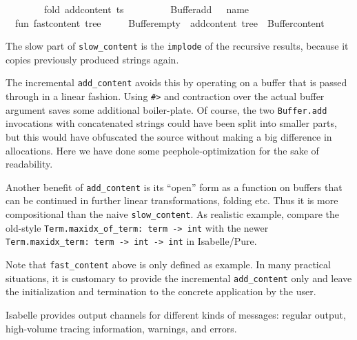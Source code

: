 \begin{isabellebody}
\ \ \ \ \ \ \ \ fold\ add{\isacharunderscore}content\ ts\ {\isacharhash}{\isachargreater}\isanewline
\ \ \ \ \ \ \ \ Buffer{\isachardot}add\ {\isacharparenleft}{\isachardoublequote}{\isacharless}{\isacharslash}{\isachardoublequote}\ {\isacharcircum}\ name\ {\isacharcircum}\ {\isachardoublequote}{\isachargreater}{\isachardoublequote}{\isacharparenright}{\isacharsemicolon}\isanewline
\isanewline
\ \ fun\ fast{\isacharunderscore}content\ tree\ {\isacharequal}\isanewline
\ \ \ \ Buffer{\isachardot}empty\ {\isacharbar}{\isachargreater}\ add{\isacharunderscore}content\ tree\ {\isacharbar}{\isachargreater}\ Buffer{\isachardot}content{\isacharsemicolon}\isanewline
{\isacharverbatimclose}%
\endisatagML
{\isafoldML}%
%
\isadelimML
%
\endisadelimML
%
\begin{isamarkuptext}%
The slow part of \verb|slow_content| is the \verb|implode| of
  the recursive results, because it copies previously produced strings
  again.

  The incremental \verb|add_content| avoids this by operating on a
  buffer that is passed through in a linear fashion.  Using \verb|#>| and contraction over the actual buffer argument saves some
  additional boiler-plate.  Of course, the two \verb|Buffer.add|
  invocations with concatenated strings could have been split into
  smaller parts, but this would have obfuscated the source without
  making a big difference in allocations.  Here we have done some
  peephole-optimization for the sake of readability.

  Another benefit of \verb|add_content| is its ``open'' form as a
  function on buffers that can be continued in further linear
  transformations, folding etc.  Thus it is more compositional than
  the naive \verb|slow_content|.  As realistic example, compare the
  old-style \verb|Term.maxidx_of_term: term -> int| with the newer
  \verb|Term.maxidx_term: term -> int -> int| in Isabelle/Pure.

  Note that \verb|fast_content| above is only defined as example.  In
  many practical situations, it is customary to provide the
  incremental \verb|add_content| only and leave the initialization and
  termination to the concrete application by the user.%
\end{isamarkuptext}%
\isamarkuptrue%
%
\isamarkuptrue%
%
\begin{isamarkuptext}%
Isabelle provides output channels for different kinds of
  messages: regular output, high-volume tracing information, warnings,
  and errors.


\end{isamarkuptext}
\end{isabellebody}

